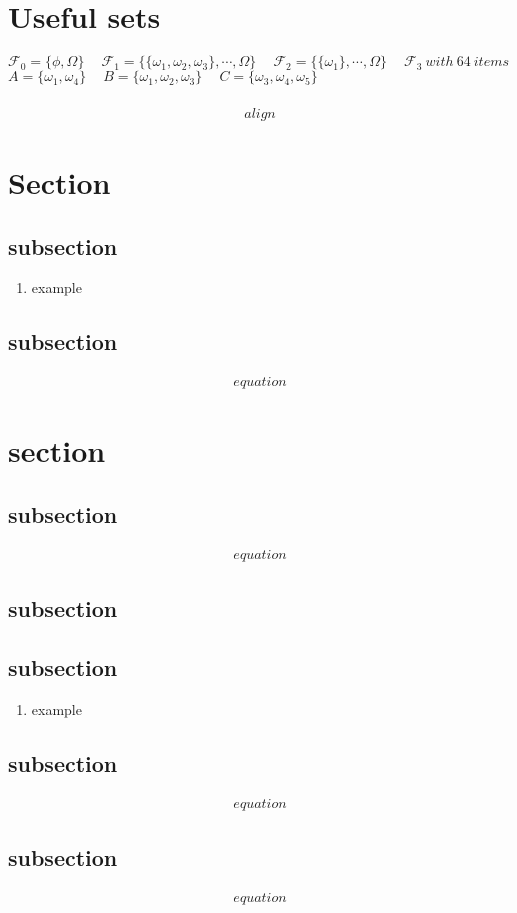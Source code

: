 \documentclass[12pt]{article}
\begin{document}
 

\rhead{\today}
\section*{Useful sets}
$\mathcal{F}_0 = \{\phi,\Omega\} \quad\ \mathcal{F}_1 = \{\{\omega_1, \omega_2, \omega_3\},\cdots, \Omega\}\quad\ \mathcal{F}_2 = \{\{\omega_1\},\cdots, \Omega\}\quad\ \mathcal{F}_3\ with\ 64\ items$\\
$A = \{\omega_1, \omega_4\}\quad\ B = \{\omega_1, \omega_2, \omega_3\}\quad\ C = \{\omega_3, \omega_4, \omega_5\}$\\\\
\begin{align*}
    align
\end{align*}
\section{Section}
\subsection*{subsection}
\begin{enumerate}
    \item example
\end{enumerate}
\subsection*{subsection}
\begin{align*}
   equation
\end{align*}
\section{section}
\subsection*{subsection}
\begin{align*}
    equation
\end{align*}
\subsection*{subsection}
\subsection*{subsection}
\begin{enumerate}
    \item example
\end{enumerate}
\subsection*{subsection}
\begin{align*}
    equation
\end{align*}
\subsection*{subsection}
\begin{align*}
    equation
\end{align*}
\end{document}
